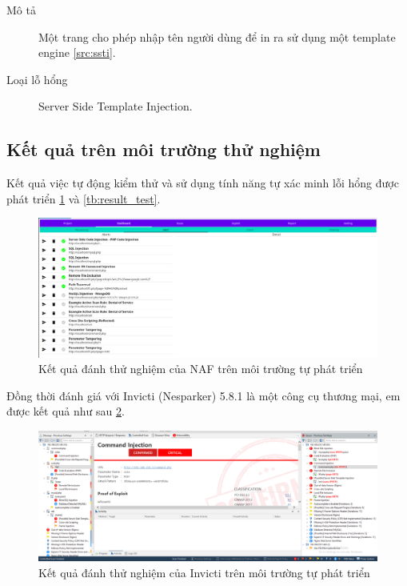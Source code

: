 \documentclass[./../main.tex]{subfiles}
\begin{document}
\begin{description}
	\item[Mô tả] Một trang cho phép nhập tên người dùng để in ra sử dụng một template engine \ref{src:ssti}.
	\item[Loại lỗ hổng] Server Side Template Injection.
\end{description}


\subsection{Kết quả trên môi trường thử nghiệm}

Kết quả việc tự động kiểm thử và sử dụng tính năng tự xác minh lỗi
hổng được phát triển \ref{fig:result_test} và \ref{tb:result_test}.

\begin{figure}[h!]
	\includegraphics[width=\linewidth]{./images/naf_result.png}
	\caption{Kết quả đánh thử nghiệm của NAF trên môi trường tự phát triển}
	\label{fig:result_test}
\end{figure}

Đồng thời đánh giá với Invicti (Nesparker) 5.8.1 là một công cụ thương mại, em được kết quả như sau \ref{fig:np_vulns}.

\begin{figure}[h!]
	\includegraphics[width=\linewidth]{./images/np.png}
	\caption{Kết quả đánh thử nghiệm của Invicti trên môi trường tự phát triển}
	\label{fig:np_vulns}
\end{figure}
\end{document}
